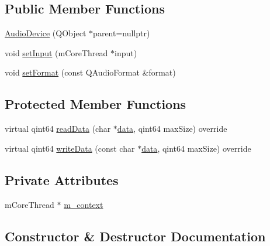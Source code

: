 \subsection*{Public Member Functions}
\begin{DoxyCompactItemize}
\item 
\mbox{\hyperlink{class_q_g_b_a_1_1_audio_device_abb418d8e6bfe657a45c0926bb6b7e1e0}{Audio\+Device}} (Q\+Object $\ast$parent=nullptr)
\item 
void \mbox{\hyperlink{class_q_g_b_a_1_1_audio_device_aa21048505d5564208f80052bfb6d14e4}{set\+Input}} (m\+Core\+Thread $\ast$input)
\item 
void \mbox{\hyperlink{class_q_g_b_a_1_1_audio_device_a915f477a13b2dd451f3989b7efff8700}{set\+Format}} (const Q\+Audio\+Format \&format)
\end{DoxyCompactItemize}
\subsection*{Protected Member Functions}
\begin{DoxyCompactItemize}
\item 
virtual qint64 \mbox{\hyperlink{class_q_g_b_a_1_1_audio_device_a95b3abf20a4341b175db35d47b9a3ea9}{read\+Data}} (char $\ast$\mbox{\hyperlink{libretro_8c_a735984d41155bc1032e09bece8f8d66d}{data}}, qint64 max\+Size) override
\item 
virtual qint64 \mbox{\hyperlink{class_q_g_b_a_1_1_audio_device_a50453569f7759d3ca48b75b4eb187952}{write\+Data}} (const char $\ast$\mbox{\hyperlink{libretro_8c_a735984d41155bc1032e09bece8f8d66d}{data}}, qint64 max\+Size) override
\end{DoxyCompactItemize}
\subsection*{Private Attributes}
\begin{DoxyCompactItemize}
\item 
m\+Core\+Thread $\ast$ \mbox{\hyperlink{class_q_g_b_a_1_1_audio_device_a6579c062be4e726ed0b5d9766201296f}{m\+\_\+context}}
\end{DoxyCompactItemize}


\subsection{Constructor \& Destructor Documentation}
\mbox{\label{class_q_g_b_a_1_1_audio_device_abb418d8e6bfe657a45c0926bb6b7e1e0}} 
